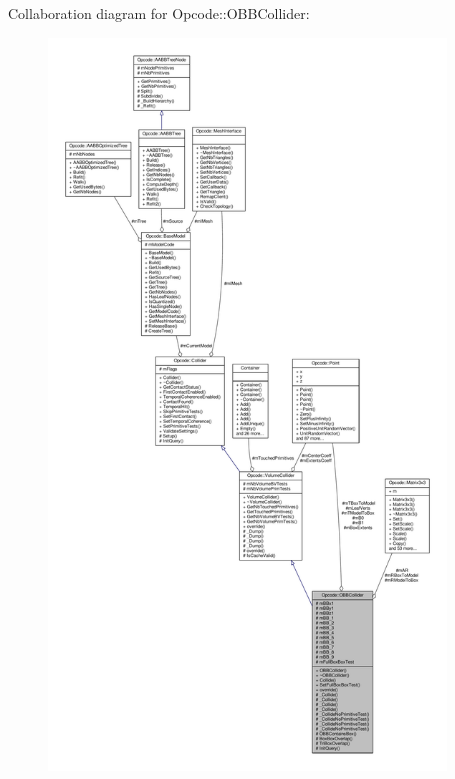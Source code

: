 Collaboration diagram for Opcode\+:\+:O\+B\+B\+Collider\+:
\nopagebreak
\begin{figure}[H]
\begin{center}
\leavevmode
\includegraphics[height=550pt]{da/d52/classOpcode_1_1OBBCollider__coll__graph}
\end{center}
\end{figure}
